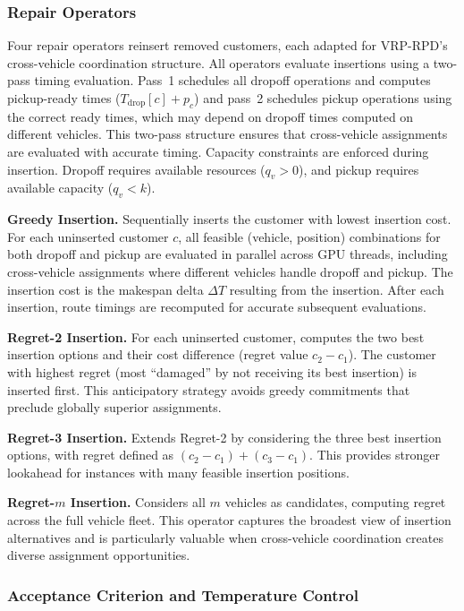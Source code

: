 \documentclass{article}
\begin{document}
\subsubsection{Repair Operators}

Four repair operators reinsert removed customers, each adapted for VRP-RPD's cross-vehicle coordination structure. All operators evaluate insertions using a two-pass timing evaluation. Pass~1 schedules all dropoff operations and computes pickup-ready times ($T_{\text{drop}}[c] + p_c$) and pass~2 schedules pickup operations using the correct ready times, which may depend on dropoff times computed on different vehicles. This two-pass structure ensures that cross-vehicle assignments are evaluated with accurate timing. Capacity constraints are enforced during insertion. Dropoff requires available resources ($q_v > 0$), and pickup requires available capacity ($q_v < k$).

\textbf{Greedy Insertion.} Sequentially inserts the customer with lowest insertion cost. For each uninserted customer $c$, all feasible (vehicle, position) combinations for both dropoff and pickup are evaluated in parallel across GPU threads, including cross-vehicle assignments where different vehicles handle dropoff and pickup. The insertion cost is the makespan delta $\Delta T$ resulting from the insertion. After each insertion, route timings are recomputed for accurate subsequent evaluations.

\textbf{Regret-2 Insertion.} For each uninserted customer, computes the two best insertion options and their cost difference (regret value $c_2 - c_1$). The customer with highest regret (most ``damaged'' by not receiving its best insertion) is inserted first. This anticipatory strategy avoids greedy commitments that preclude globally superior assignments.

\textbf{Regret-3 Insertion.} Extends Regret-2 by considering the three best insertion options, with regret defined as $(c_2 - c_1) + (c_3 - c_1)$. This provides stronger lookahead for instances with many feasible insertion positions.

\textbf{Regret-$m$ Insertion.} Considers all $m$ vehicles as candidates, computing regret across the full vehicle fleet. This operator captures the broadest view of insertion alternatives and is particularly valuable when cross-vehicle coordination creates diverse assignment opportunities.

\subsubsection{Acceptance Criterion and Temperature Control}
\end{document}
